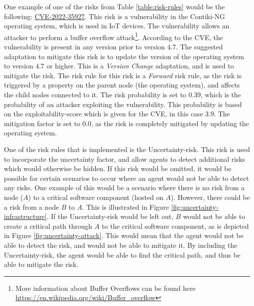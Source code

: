 One example of one of the risks from Table \ref{table:risk-rules} would be the following: \href{https://nvd.nist.gov/vuln/detail/CVE-2022-35927}{CVE-2022-35927}.
This risk is a vulnerability in the Contiki-NG operating system, which is used in IoT devices. The vulnerability allows an attacker to perform a buffer overflow attack\footnote{More information about Buffer Overflows can be found here \url{https://en.wikipedia.org/wiki/Buffer_overflow}}. According to the CVE, the vulnerability is present in any version prior to version $4.7$. The suggested adaptation to mitigate this risk is to update the version of the operating system to version $4.7$ or higher. This is a \emph{Version Change} adaptation, and is used to mitigate the risk. The risk rule for this risk is a \emph{Forward} risk rule, as the risk is triggered by a property on the parent node (the operating system), and affects the child nodes connected to it. The risk probability is set to $0.39$, which is the probability of an attacker exploiting the vulnerability. This probability is based on the exploitability-score which is given for the CVE, in this case $3.9$. The mitigation factor is set to $0.0$, as the risk is completely mitigated by updating the operating system.  

One of the risk rules that is implemented is the Uncertainty-risk. This risk is used to incorporate the uncertainty factor, and allow agents to detect additional risks which would otherwise be hidden. If this risk would be omitted, it would be possible for certain scenarios to occur where an agent would not be able to detect any risks. One example of this would be a scenario where there is no risk from a node ($A$) to a critical software component (hosted on $A$). However, there could be a risk from a node $B$ to $A$. This is illustrated in Figure \ref{fig:uncertainty-infrastructure}. If the Uncertainty-risk would be left out, $B$ would not be able to create a critical path through $A$ to the critical software component, as is depicted in Figure \ref{fig:uncertainty-attack}. This would mean that the agent would not be able to detect the risk, and would not be able to mitigate it. By including the Uncertainty-risk, the agent would be able to find the critical path, and thus be able to mitigate the risk.

